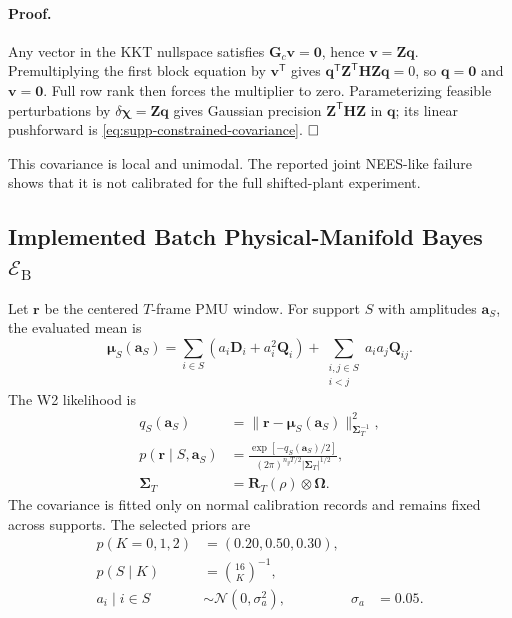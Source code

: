 \paragraph{Proof.}
Any vector in the KKT nullspace satisfies $\bm G_c\bm v=\bm0$, hence $\bm v=\bm Z\bm q$. Premultiplying the first block equation by $\bm v^{\mathsf T}$ gives
$\bm q^{\mathsf T}\bm Z^{\mathsf T}\bm H\bm Z\bm q=0$, so $\bm q=\bm0$ and $\bm v=\bm0$. Full row rank then forces the multiplier to zero. Parameterizing feasible perturbations by $\delta\bm\chi=\bm Z\bm q$ gives Gaussian precision $\bm Z^{\mathsf T}\bm H\bm Z$ in $\bm q$; its linear pushforward is \eqref{eq:supp-constrained-covariance}. $\hfill\square$

This covariance is local and unimodal. The reported joint NEES-like failure shows that it is not calibrated for the full shifted-plant experiment.

\subsection{Implemented Batch Physical-Manifold Bayes $\mathcal E_{\mathrm B}$}
\label{sec:supp-evaluated-event-bank}

Let $\bm r$ be the centered $T$-frame PMU window. For support $S$ with amplitudes $\bm a_S$, the evaluated mean is
\begin{equation}
 \bm\mu_S(\bm a_S)=
 \sum_{i\in S}(a_i\bm D_i+a_i^2\bm Q_i)
 +\sum_{\substack{i,j\in S\\i<j}}a_ia_j\bm Q_{ij}.
 \label{eq:supp-evaluated-event-mean}
\end{equation}
The W2 likelihood is
\begin{align}
 q_S(\bm a_S)
 &=\|\bm r-\bm\mu_S(\bm a_S)\|_{\bm\Sigma_T^{-1}}^2,\\
 p(\bm r\mid S,\bm a_S)
 &=\frac{\exp[-q_S(\bm a_S)/2]}
 {(2\pi)^{n_yT/2}|\bm\Sigma_T|^{1/2}},\\
 \bm\Sigma_T&=\bm R_T(\rho)\otimes\bm\Omega.
 \label{eq:supp-evaluated-likelihood}
\end{align}
The covariance is fitted only on normal calibration records and remains fixed across supports. The selected priors are
\begin{align}
 p(K=0,1,2)&=(0.20,0.50,0.30),\\
 p(S\mid K)&=\binom{16}{K}^{-1},\\
 a_i\mid i\in S&\sim\mathcal N(0,\sigma_a^2),
 &\sigma_a&=0.05.
 \label{eq:supp-evaluated-priors}
\end{align}

